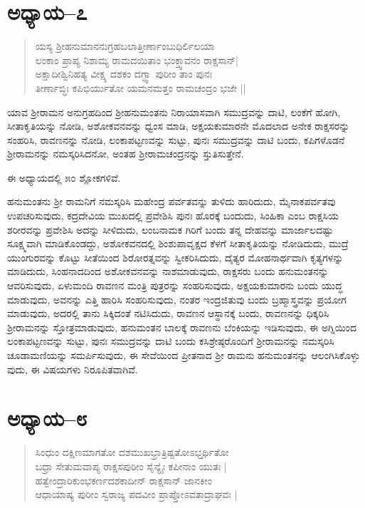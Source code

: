 \section{ಅಧ್ಯಾಯ–೭}

\begin{verse}
ಯಸ್ಯ ಶ‍್ರೀಹನುಮಾನನುಗ್ರಹಬಲಾತ್ತೀರ್ಣಾಂಬುಧಿರ್ಲಿಲಯಾ \\ ಲಂಕಾಂ ಪ್ರಾಪ್ಯ ನಿಶಾಮ್ಯ ರಾಮದಯಿತಾಂ ಭಂಕ್ತ್ವಾವನಂ ರಾಕ್ಷಸಾನ್| \\ ಅಕ್ಷಾದೀಶ್ವಿನಿಹತ್ಯ ವೀಕ್ಷ್ಯ ದಶಕಂ ದಗ್ಧ್ವಾ ಪುರೀಂ ತಾಂ ಪುನಃ\\ ತೀರ್ಣಾಬ್ಧಿಃ ಕಪಿಭಿರ್ಯುತೋ ಯಮನಮತ್ತಂ ರಾಮಚಂದ್ರಂ ಭಜೇ ||
\end{verse}

ಯಾವ ಶ‍್ರೀರಾಮನ ಅನುಗ್ರಹದಿಂದ ಶ‍್ರೀಹನುಮಂತನು ನಿರಾಯಾಸವಾಗಿ ಸಮುದ್ರವನ್ನು ದಾಟಿ, ಲಂಕೆಗೆ ಹೋಗಿ, ಸೀತಾಕೃತಿಯನ್ನು ನೋಡಿ, ಅಶೋಕವನವನ್ನು ಧ್ವಂಸ ಮಾಡಿ, ಅಕ್ಷಯಕುಮಾರನೇ ಮೊದಲಾದ ಅನೇಕ ರಾಕ್ಷಸರನ್ನು ಸಂಹರಿಸಿ, ರಾವಣನನ್ನು ನೋಡಿ, ಲಂಕಾಪಟ್ಟಣವನ್ನು ಸುಟ್ಟು, ಪುನಃ ಸಮುದ್ರವನ್ನು ದಾಟಿ ಬಂದು, ಕಪಿಗಳೊಡನೆ ಶ‍್ರೀರಾಮನನ್ನು ನಮಸ್ಕರಿಸಿದನೋ, ಅಂತಹ ಶ‍್ರೀರಾಮಚಂದ್ರನನ್ನು ಸ್ತುತಿಸುತ್ತೇನೆ.

ಈ ಅಧ್ಯಾಯದಲ್ಲಿ ೫೦ ಶ್ಲೋಕಗಳಿವೆ.

ಹನುಮಂತನು ಶ‍್ರೀ ರಾಮನಿಗೆ ನಮಸ್ಕರಿಸಿ ಮಹೇಂದ್ರ ಪರ್ವತವನ್ನು ತುಳಿದು ಹಾರಿದುದು, ಮೈನಾಕಪರ್ವತವು ಉಪಚರಿಸುವುದು, ಕದ್ರದೇವಿಯ ಮುಖದಲ್ಲಿ ಪ್ರವೇಶಿಸಿ ಪುನಃ ಹೊರಕ್ಕೆ ಬಂದುದು, ಸಿಂಹಿಕಾ ಎಂಬ ರಾಕ್ಷಸಿಯ ಶರೀರವನ್ನು ಪ್ರವೇಶಿಸಿ ಅದನ್ನು ಸೀಳಿದುದು, ಲಂಬನಾಮಕ ಗಿರಿಗೆ ಬಂದು ತನ್ನ ದೇಹವನ್ನು ಮಾರ್ಜಾಲದಷ್ಟು ಸೂಕ್ಷ್ಮವಾಗಿ ಮಾಡಿಕೊಂಡದ್ದು, ಅಶೋಕವನದಲ್ಲಿ ಶಿಂಶುಪಾವೃಕ್ಷದ ಕೆಳಗೆ ಸೀತಾಕೃತಿಯನ್ನು ನೋಡಿದುದು, ಮುದ್ರೆ ಯುಂಗುರವನ್ನು ಕೊಟ್ಟು ಸೀತೆಯಿಂದ ಶಿರೋರತ್ನವನ್ನು ಸ್ವೀಕರಿಸಿದುದು, ದೈತ್ಯರ ಮೋಹನಾರ್ಥವಾಗಿ ಕೃತ್ಯಗಳನ್ನು ಮಾಡಿದುದು, ಸಿಂಹನಾದದಿಂದ ಅಶೋಕವನವನ್ನು ನಾಶಮಾಡುವುದು, ರಾಕ್ಷಸರು ಬಂದು ಹನುಮಂತನನ್ನು ಆವರಿಸುವುದು, ಏಳುಮಂದಿ ರಾವಣನ ಮಂತ್ರಿ ಪುತ್ರರನ್ನು ಸಂಹರಿಸುವುದು, ಅಕ್ಷಯಕುಮಾರನು ಬಂದು ಯುದ್ಧ ಮಾಡುವುದು, ಅವನನ್ನು ಎತ್ತಿ ಹಾರಿಸಿ ಸಂಹರಿಸುವುದು, ನಂತರ ಇಂದ್ರಜಿತುವು ಬಂದು ಬ್ರಹ್ಮಾಸ್ತ್ರವನ್ನು ಪ್ರಯೋಗ ಮಾಡುವುದು, ಅದರಲ್ಲಿ ತಾನು ಸಿಕ್ಕಿದಂತೆ ನಟಿಸಿದುದು, ರಾವಣನ ಆಸ್ಥಾನಕ್ಕೆ ಬಂದು, ರಾವಣನನ್ನು ಧಿಕ್ಕರಿಸಿ ಶ‍್ರೀರಾಮನನ್ನು ಸ್ತೋತ್ರಮಾಡುವುದು, ಹನುಮಂತನ ಬಾಲಕ್ಕೆ ರಾವಣನು ಬೆಂಕಿಯನ್ನು ಇಡಿಸುವುದು, ಈ ಅಗ್ನಿಯಿಂದ ಲಂಕಾಪಟ್ಟಣವನ್ನು ಸುಟ್ಟು, ಪುನಃ ಸಮುದ್ರವನ್ನು ದಾಟಿ ಬಂದು ಕಸಿಶ್ರೇಷ್ಠರೊಂದಿಗೆ ಶ‍್ರೀರಾಮನನ್ನು ನಮಸ್ಕರಿಸಿ ಚೂಡಾಮಣಿಯನ್ನು ಸಮರ್ಪಿಸುವುದು, ಈ ಸೇವೆಯಿಂದ ಪ್ರೀತನಾದ ಶ‍್ರೀ ರಾಮನು ಹನುಮಂತನನ್ನು ಆಲಂಗಿಸಿಕೊಳ್ಳು ವುದು, ಈ ವಿಷಯಗಳು ನಿರೂಪಿತವಾಗಿವೆ.


\section{ಅಧ್ಯಾಯ–೮}

\begin{verse}
ಸಿಂಧುಂ ದಕ್ಷಿಣಮಾಗತೋ ದಶಮುಖಭ್ರಾತ್ರಿಷ್ಟತೋಽಭ್ತರ್ಥಿತೋ \\ ಬಧ್ರಾ ಸೇತುಮವಾಪ್ಯ ರಾಕ್ಷಸಪುರೀಂ ಸೈನ್ಯೈಃ ಕಪೀನಾಂ ಯುತಃ | \\ ಹತ್ವೇಂದ್ರಾರಿಕುಂಭಕರ್ಣದಶಕಾದೀನ್ ರಾಕ್ಷಸಾನ್ ಜಾನಕೀಂ \\ ಆಧಾಯಾಷ್ಯ ಪುರೀಂ ಸ್ವರಾಜ್ಯ ಪದವೀಂ ಪ್ರಾಪ್ತೋಽವತಾದ್ರಾಘವಃ |
\end{verse}


